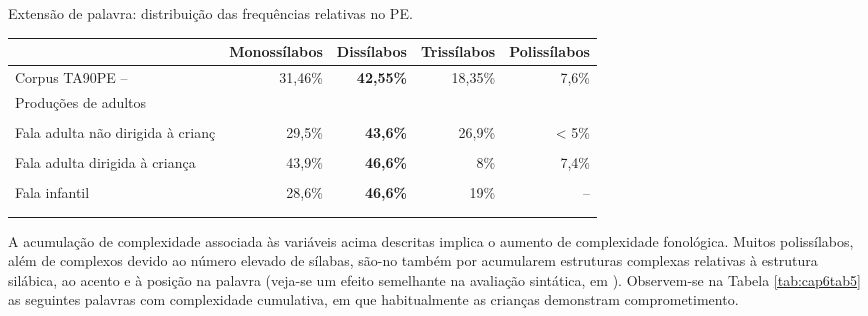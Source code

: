 \documentclass[output=paper,colorlinks,citecolor=brown,booklanguage=portuguese]{langscibook}
\begin{document}
\begin{Tabela}
\caption{Extensão de palavra: distribuição das frequências relativas no PE.}
\label{tab:cap6tab4}


\begin{tabularx}{\textwidth}{Qrrrr}
\lsptoprule
& \textbf{\small{Monossílabos}} & \textbf{\small{Dissílabos}} & \textbf{\small{Trissílabos}} & \textbf{\small{Polissílabos}}\\
\midrule
Corpus TA90PE -- & 31,46\% &	\textbf{42,55\%} &	18,35\% &	7,6\%\\
 Produções de adultos & &&&  \\
 \citep{Vigario2005}&&&&\\
 \tablevspace
 Fala adulta não dirigida à crianç & 29,5\% &	\textbf{43,6\%} &	26,9\% &	< 5\%\\
 \citep{Vigario2006} &&&&\\
 \tablevspace
 Fala adulta dirigida à criança & 43,9\%	& \textbf{46,6\%} &	8\% &	7,4\%\\
 \citep{Vigario2006}\\
 \tablevspace
 Fala infantil & 28,6\% &	\textbf{46,6\%} &	19\% &	--\\
 \citep{Vigario2006} &&&&\\
\lspbottomrule
\end{tabularx}
\end{Tabela}


A acumulação de complexidade associada às variáveis acima descritas implica o aumento de complexidade fonológica. Muitos polissílabos, além de complexos devido ao número elevado de sílabas, são-no também por acumularem estruturas complexas relativas à estrutura silábica, ao acento e à posição na palavra (veja-se um efeito semelhante na avaliação sintática, em ). Observem-se na Tabela \ref{tab:cap6tab5} as seguintes palavras com complexidade cumulativa, em que habitualmente as crianças demonstram comprometimento.
\end{document}
